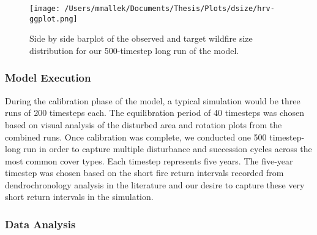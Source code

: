 

\begin{figure}[!htbp]
  \centering
    \centering
    \texttt{[image: /Users/mmallek/Documents/Thesis/Plots/dsize/hrv-ggplot.png]}
  \caption{Side by side barplot of the observed and target wildfire size distribution for our 500-timestep long run of the model.}
  \label{fig:dsize}
\end{figure}

\subsubsection{Model Execution}
During the calibration phase of the model, a typical simulation would be three runs of 200 timesteps each. The equilibration period of 40 timesteps was chosen based on visual analysis of the disturbed area and rotation plots from the combined runs. Once calibration was complete, we conducted one 500 timestep-long run in order to capture multiple disturbance and succession cycles across the most common cover types. Each timestep represents five years. The five-year timestep was chosen based on the short fire return intervals recorded from dendrochronology analysis in the literature and our desire to capture these very short return intervals in the simulation.

\subsubsection{Data Analysis}
\label{subsec:dataanalysis}


